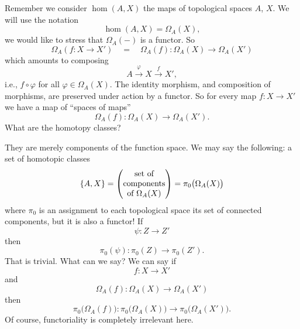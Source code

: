 
Remember we consider $\hom(A,X)$ the maps of topological spaces
$A$, $X$. We will use the notation
\begin{equation}
\hom(A,X)=\Omega_{A}(X),
\end{equation}
we would like to stress that $\Omega_{A}(-)$ is a functor. So
\begin{equation}
\Omega_{A}\left(f\colon X\to X'\right)\quad=\quad
\Omega_{A}(f)\colon\Omega_{A}(X)\to\Omega_{A}(X')
\end{equation}
which amounts to composing
\begin{equation}
A\xrightarrow{\varphi}X\xrightarrow{f}X',
\end{equation}
i.e., $f\circ\varphi$ for all $\varphi\in\Omega_{A}(X)$. The
identity morphism, and composition of morphisms, are preserved
under action by a functor. So for every map $f\colon X\to X'$ we
have a map of ``spaces of maps''
\begin{equation}
\Omega_{A}(f)\colon\Omega_{A}(X)\to\Omega_{A}(X').
\end{equation}
What are the homotopy classes?

They are merely components of the function space. We may say the
following: a set of homotopic classes
\begin{equation}
\homotopyClass(A,X)=\begin{pmatrix}\mbox{set of}\\
\mbox{components}\\
\mbox{of }\Omega_{A}(X)
\end{pmatrix} = \pi_{0}\bigl(\Omega_{A}(X)\bigr)
\end{equation}
where $\pi_{0}$ is an assignment to each topological space its
set of connected components, but it is also a functor! If
\begin{equation}
\psi\colon Z\to Z'
\end{equation}
then
\begin{equation}
\pi_{0}(\psi)\colon\pi_{0}(Z)\to\pi_{0}(Z').
\end{equation}
That is trivial. What can we say? We can say if
\begin{equation}
f\colon X\to X'
\end{equation}
and
\begin{equation}
\Omega_{A}(f)\colon\Omega_{A}(X)\to\Omega_{A}(X')
\end{equation}
then
\begin{equation}
\pi_{0}\bigl(\Omega_{A}(f)\bigr)\colon\pi_{0}\bigl(\Omega_{A}(X)\bigr)\to\pi_{0}\bigl(\Omega_{A}(X')\bigr).
\end{equation}
Of course, functoriality is completely irrelevant here.

